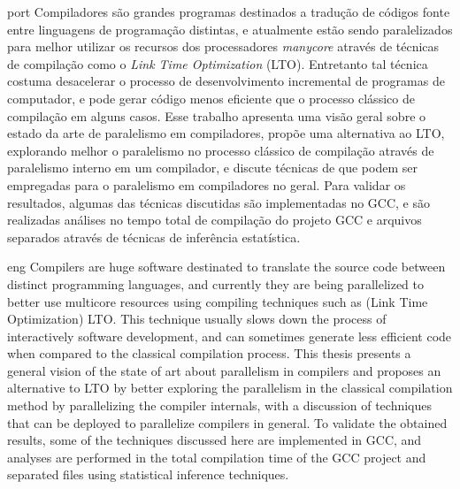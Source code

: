 \begin{resumo}{port}
    Compiladores são grandes programas destinados a tradução de códigos fonte
    entre linguagens de programação distintas, e atualmente estão sendo
    paralelizados para melhor utilizar os recursos dos processadores
    \textit{manycore} através de técnicas de compilação como o \textit{Link
    Time Optimization} (LTO).  Entretanto tal técnica costuma desacelerar o
    processo de desenvolvimento incremental de programas de computador, e pode
    gerar código menos eficiente que o processo clássico de compilação em
    alguns casos. Esse trabalho apresenta uma visão geral sobre o estado da
    arte de paralelismo em compiladores, propõe uma alternativa ao LTO,
    explorando melhor o paralelismo no processo clássico de compilação através
    de paralelismo interno em um compilador, e discute técnicas de que podem
    ser empregadas para o paralelismo em compiladores no geral.  Para validar
    os resultados, algumas das técnicas discutidas são implementadas no GCC, e
    são realizadas análises no tempo total de compilação do projeto GCC e
    arquivos separados através de técnicas de inferência estatística.
\end{resumo}

\begin{resumo}{eng}
Compilers are huge software destinated to translate the source code between
distinct programming languages, and currently they are being parallelized
to better use multicore resources using compiling techniques such as (Link
Time Optimization) LTO. This technique usually slows down the process of
interactively software development, and can sometimes generate less
efficient code when compared to the classical compilation process. This
thesis presents a general vision of the state of art about parallelism in compilers
and proposes an alternative to LTO by better exploring the parallelism
in the classical compilation method by parallelizing the compiler
internals, with a discussion of techniques that can be deployed to
parallelize compilers in general. To validate the obtained results, some of
the techniques discussed here are implemented in GCC, and analyses are
performed in the total compilation time of the GCC project and separated
files using statistical inference techniques.
\end{resumo}
